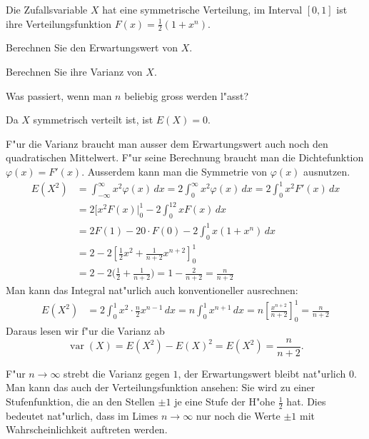 Die Zufallsvariable $X$ hat eine symmetrische Verteilung, im
Interval $[0,1]$ ist ihre Verteilungsfunktion $F(x)=\frac12(1+x^n)$.
\begin{teilaufgaben}
\item
Berechnen Sie den Erwartungswert von $X$.
\item
Berechnen Sie ihre Varianz von $X$.
\item
Was passiert, wenn man $n$ beliebig gross werden l"asst?
\end{teilaufgaben}

\begin{loesung}
\begin{teilaufgaben}
\item Da $X$ symmetrisch verteilt ist, ist $E(X)=0$.
\item
F"ur die Varianz braucht man ausser dem Erwartungswert auch noch
den quadratischen Mittelwert.  F"ur seine Berechnung braucht man die
Dichtefunktion $\varphi(x)=F'(x)$. Ausserdem kann man die Symmetrie
von $\varphi(x)$ ausnutzen.
\begin{align*}
E(X^2)
&=
\int_{-\infty}^{\infty}x^2\varphi(x)\,dx
=
2\int_{0}^{\infty}x^2\varphi(x)\,dx
=2\int_0^1 x^2 F'(x)\,dx\\
&=
2[x^2F(x)|_0^1-2\int_0^12xF(x)\,dx
\\
&=
2F(1)-20\cdot F(0)-2\int_0^1x(1+x^n)\,dx
\\
&=
2-2\left[
\frac12x^2+\frac1{n+2}x^{n+2}
\right]_0^1
\\
&=
2-2\biggl(\frac12+\frac1{n+2}\biggr)
=
1-\frac{2}{n+2}
=
\frac{n}{n+2}
\end{align*}
Man kann das Integral nat"urlich auch konventioneller ausrechnen:
\begin{align*}
E(X^2)&=2\int_0^1x^2\cdot\frac{n}2x^{n-1}\,dx
=
n\int_0^1x^{n+1}\,dx=n\left[\frac{x^{n+2}}{n+2}\right]_0^1
=\frac{n}{n+2}
\end{align*}
Daraus lesen wir f"ur die Varianz ab
\[
\operatorname{var}(X)=E(X^2)-E(X)^2=E(X^2)=\frac{n}{n+2}.
\]
\item
F"ur $n\to\infty$ strebt die Varianz gegen $1$, der Erwartungswert
bleibt nat"urlich $0$. Man kann das auch der Verteilungsfunktion
ansehen: Sie wird zu einer Stufenfunktion, die an den Stellen
$\pm 1$ je eine Stufe der H"ohe $\frac12$ hat. Dies bedeutet
nat"urlich, dass im Limes $n\to\infty$ nur noch die Werte $\pm1$ mit
Wahrscheinlichkeit auftreten werden.
\end{teilaufgaben}
\end{loesung}

